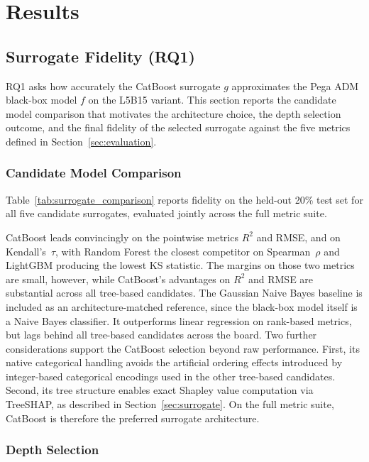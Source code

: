 \documentclass[oneside]{memoir} %
\begin{document}
\chapter{Results} \label{ch:results}
\section{Surrogate Fidelity (RQ1)} \label{sec:rq1}

RQ1 asks how accurately the CatBoost surrogate $g$ approximates the Pega ADM black-box model $f$ on the L5B15 variant. This section reports the candidate model comparison that motivates the architecture choice, the depth selection outcome, and the final fidelity of the selected surrogate against the five metrics defined in Section~\ref{sec:evaluation}.

\subsection{Candidate Model Comparison}

Table~\ref{tab:surrogate_comparison} reports fidelity on the held-out 20\% test set for all five candidate surrogates, evaluated jointly across the full metric suite.



CatBoost leads convincingly on the pointwise metrics $R^2$ and RMSE, and on Kendall's~$\tau$, with Random Forest the closest competitor on Spearman~$\rho$ and LightGBM producing the lowest KS statistic. The margins on those two metrics are small, however, while CatBoost's advantages on $R^2$ and RMSE are substantial across all tree-based candidates. The Gaussian Naive Bayes baseline is included as an architecture-matched reference, since the black-box model itself is a Naive Bayes classifier. It outperforms linear regression on rank-based metrics, but lags behind all tree-based candidates across the board. Two further considerations support the CatBoost selection beyond raw performance. First, its native categorical handling avoids the artificial ordering effects introduced by integer-based categorical encodings used in the other tree-based candidates. Second, its tree structure enables exact Shapley value computation via TreeSHAP, as described in Section~\ref{sec:surrogate}. On the full metric suite, CatBoost is therefore the preferred surrogate architecture.

\subsection{Depth Selection}
\end{document}
